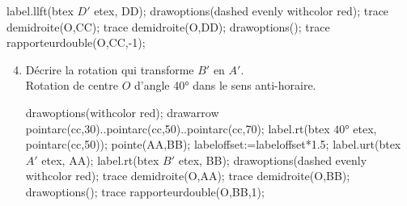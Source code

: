 \begin{corrige}
\begin{enumerate}
\begin{Geometrie}[CoinHD={(7u,6u)}]
                label.llft(btex $D'$ etex, DD);
                drawoptions(dashed evenly withcolor red);
                trace demidroite(O,CC);
                trace demidroite(O,DD);
                drawoptions();
                trace rapporteurdouble(O,CC,-1);
            \end{Geometrie}
    \end{enumerate}
    \Coupe 
    \begin{enumerate}            
        \setcounter{enumi}{3}            
        \item Décrire la rotation qui transforme $B'$ en $A'$.\\
        {\red Rotation de centre $O$ d'angle \ang{40} dans le sens anti-horaire.}\\
            \begin{Geometrie}[CoinHD={(7u,6u)}]    
                \enonceTroisiemeGTroisExoDix
                drawoptions(withcolor red);
                drawarrow pointarc(cc,30)..pointarc(cc,50)..pointarc(cc,70);
                label.rt(btex $\ang{40}$ etex, pointarc(cc,50));    
                pointe(AA,BB);
                labeloffset:=labeloffset*1.5;
                label.urt(btex $A'$ etex, AA);
                label.rt(btex $B'$ etex, BB);
                drawoptions(dashed evenly withcolor red);
                trace demidroite(O,AA);
                trace demidroite(O,BB);
                drawoptions();
                trace rapporteurdouble(O,BB,1);
            \end{Geometrie}
    \end{enumerate}
\end{corrige}

